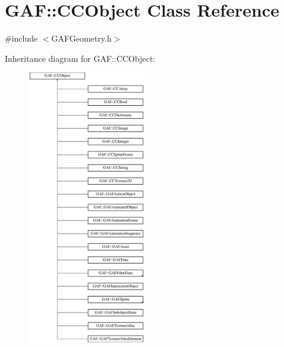 \hypertarget{class_g_a_f_1_1_c_c_object}{\section{G\-A\-F\-:\-:C\-C\-Object Class Reference}
\label{class_g_a_f_1_1_c_c_object}
}


{\ttfamily \#include $<$G\-A\-F\-Geometry.\-h$>$}

Inheritance diagram for G\-A\-F\-:\-:C\-C\-Object\-:\begin{figure}[H]
\begin{center}
\leavevmode
\includegraphics[height=12.000000cm]{class_g_a_f_1_1_c_c_object}
\end{center}
\end{figure}
